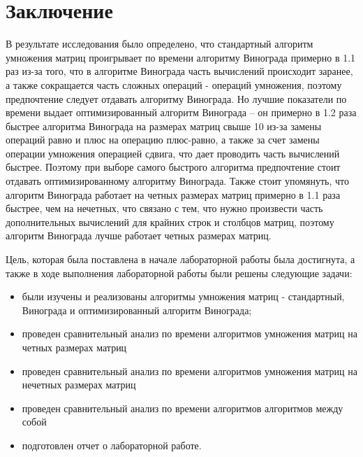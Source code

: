 \chapter*{Заключение}

В результате исследования было определено, что стандартный алгоритм умножения матриц проигрывает по времени алгоритму Винограда примерно в 1.1 раз из-за того, что в алгоритме Винограда часть вычислений происходит заранее, а также сокращается часть сложных операций - операций умножения, поэтому предпочтение следует отдавать алгоритму Винограда. Но лучшие показатели по времени выдает оптимизированный алгоритм Винограда -- он примерно в 1.2 раза быстрее алгоритма Винограда на размерах матриц свыше 10 из-за замены операций равно и плюс на операцию плюс-равно, а также за счет замены операции умножения операцией сдвига, что дает проводить часть вычислений быстрее. Поэтому при выборе самого быстрого алгоритма предпочтение стоит отдавать оптимизированному алгоритму Винограда. Также стоит упомянуть, что алгоритм Винограда работает на четных размерах матриц примерно в 1.1 раза быстрее, чем на нечетных, что связано с тем, что нужно произвести часть дополнительных вычислений для крайних строк и столбцов матриц, поэтому алгоритм Винограда лучше работает четных размерах матриц.


Цель, которая была поставлена в начале лабораторной работы была достигнута, а также в ходе выполнения лабораторной работы были решены следующие задачи:

\begin{itemize}
	\item были изучены и реализованы алгоритмы умножения матриц - стандартный, Винограда и оптимизированный алгоритм Винограда;
    \item проведен сравнительный анализ по времени алгоритмов умножения матриц на четных размерах матриц
	\item проведен сравнительный анализ по времени алгоритмов умножения матриц на нечетных размерах матриц
	\item проведен сравнительный анализ по времени алгоритмов алгоритмов между собой
	\item подготовлен отчет о лабораторной работе.
\end{itemize}